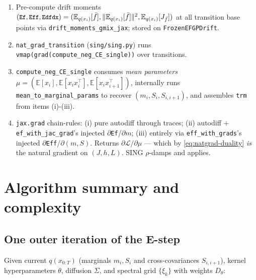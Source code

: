 \documentclass[11pt]{article}
\newcommand{\E}{\mathbb{E}}
\newcommand{\Eqx}{\mathbb{E}_{q(x_i)}}
\newcommand{\code}[1]{\texttt{\small #1}}
\begin{document}
\begin{enumerate}\setlength\itemsep{2pt}
\item Pre-compute drift moments
  $(\code{Ef}, \code{Eff}, \code{Edfdx}) = (\Eqx[\bar f],
  \|\Eqx[\bar f]\|^2, \Eqx[J_{\bar f}])$ at all transition base points
  via \code{drift\_moments\_gmix\_jax}; stored on
  \code{FrozenEFGPDrift}.
\item \code{nat\_grad\_transition} (\code{sing/sing.py}) runs
  \code{vmap(grad(compute\_neg\_CE\_single))} over transitions.
\item \code{compute\_neg\_CE\_single} consumes \emph{mean parameters}
  $\mu = (\E[x_i], \E[x_i x_i^\top], \E[x_i x_{i+1}^\top])$, internally
  runs \code{mean\_to\_marginal\_params} to recover $(m_i, S_i, S_{i,i+1})$,
  and assembles \code{trm} from items (i)-(iii).
\item \code{jax.grad} chain-rules:
  (i) pure autodiff through traces;
  (ii) autodiff $+$ \code{ef\_with\_jac\_grad}'s injected
  $\partial$\code{Ef}/$\partial m$;
  (iii) entirely via \code{eff\_with\_grads}'s injected
  $\partial$\code{Eff}/$\partial(m, S)$.
  Returns $\partial\mathcal{L}/\partial\mu$ --- which by
  \eqref{eq:natgrad-duality} \emph{is} the natural gradient on
  $(J, h, L)$. SING $\rho$-damps and applies.
\end{enumerate}

\section{Algorithm summary and complexity}
\label{sec:algorithm}

\subsection*{One outer iteration of the E-step}

Given current $q(x_{0:T})$ (marginals $m_i, S_i$ and cross-covariances
$S_{i,i+1}$), kernel hyperparameters $\theta$, diffusion $\Sigma$, and
spectral grid $\{\xi_k\}$ with weights $D_\theta$:
\end{document}
